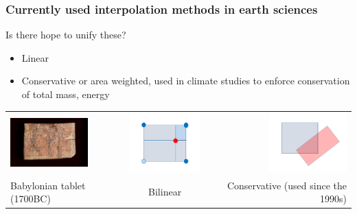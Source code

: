 \documentclass[aspectratio=169]{beamer}
\begin{document}
\begin{frame}[t]
  \frametitle{Currently used interpolation methods in earth sciences}
    \begin{block}{Is there hope to unify these?}
      \begin{itemize}%
	  \item Linear
      \item Conservative or area weighted, used in climate studies to enforce conservation of total mass, energy
    \end{itemize}
  \end{block}
  \begin{tabular}{lcr}
      \includegraphics[width=30mm]{babylonianTablet.jpeg} & \includegraphics[width=30mm]{bilinear.png} & \includegraphics[width=30mm]{conservative.png} \\
      {Babylonian tablet (1700BC)} & {Bilinear} & {Conservative (used since the 1990s)}  
\end{tabular}
\end{frame}
\end{document}
